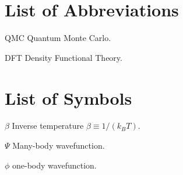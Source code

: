 \listoftables
\listoffigures

\chapter{List of Abbreviations}

\begin{symbollist*}
\item[QMC] Quantum Monte Carlo.
\item[DFT] Density Functional Theory.
\end{symbollist*}

\chapter{List of Symbols}

\begin{symbollist}[0.7in]
\item[$\beta$] Inverse temperature $\beta\equiv 1/(k_B T)$.
\item[$\Psi$] Many-body wavefunction.
\item[$\phi$] one-body wavefunction.
\end{symbollist}